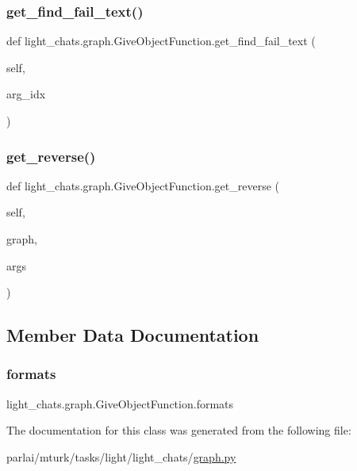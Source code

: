 \subsubsection{\texorpdfstring{get\+\_\+find\+\_\+fail\+\_\+text()}{get\_find\_fail\_text()}}
{\footnotesize\ttfamily def light\+\_\+chats.\+graph.\+Give\+Object\+Function.\+get\+\_\+find\+\_\+fail\+\_\+text (\begin{DoxyParamCaption}\item[{}]{self,  }\item[{}]{arg\+\_\+idx }\end{DoxyParamCaption})}

\mbox{\label{classlight__chats_1_1graph_1_1GiveObjectFunction_a5339f851bf119b82f9f8d8abbbeeabb3}} 
\subsubsection{\texorpdfstring{get\+\_\+reverse()}{get\_reverse()}}
{\footnotesize\ttfamily def light\+\_\+chats.\+graph.\+Give\+Object\+Function.\+get\+\_\+reverse (\begin{DoxyParamCaption}\item[{}]{self,  }\item[{}]{graph,  }\item[{}]{args }\end{DoxyParamCaption})}



\subsection{Member Data Documentation}
\mbox{\label{classlight__chats_1_1graph_1_1GiveObjectFunction_a0fec6f9aa2b89ddc4ab44917d13eaaf6}} 
\subsubsection{\texorpdfstring{formats}{formats}}
{\footnotesize\ttfamily light\+\_\+chats.\+graph.\+Give\+Object\+Function.\+formats}



The documentation for this class was generated from the following file\+:\begin{DoxyCompactItemize}
\item 
parlai/mturk/tasks/light/light\+\_\+chats/\hyperlink{parlai_2mturk_2tasks_2light_2light__chats_2graph_8py}{graph.\+py}\end{DoxyCompactItemize}
